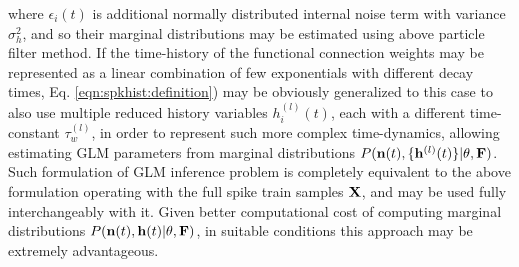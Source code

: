 where $\epsilon_i(t)$ is additional normally distributed internal noise term with variance $\sigma^2_h$, and so their marginal distributions may be estimated using above particle filter method. If the time-history of the  functional connection weights may be represented as a linear combination of few exponentials with different decay times, Eq. \eqref{eqn:spkhist:definition}) may be obviously generalized to this case to also use multiple reduced history variables $h_i^{(l)}(t)$, each with a different time-constant $\tau^{(l)}_w$, in order to represent such more complex time-dynamics, allowing estimating GLM parameters from marginal distributions $P({\bf n}(t), \{{\bf h}^{(l)}(t)\}|\mathbf{\theta}, {\bf F})$.  Such formulation of GLM inference problem is completely equivalent to the above formulation operating with the full spike train samples ${\bf X}$, and may be used fully interchangeably with it. Given better computational cost of computing marginal distributions $P({\bf n}(t), {\bf h}(t)|\mathbf{\theta}, {\bf F})$, in suitable conditions this approach may be extremely advantageous.